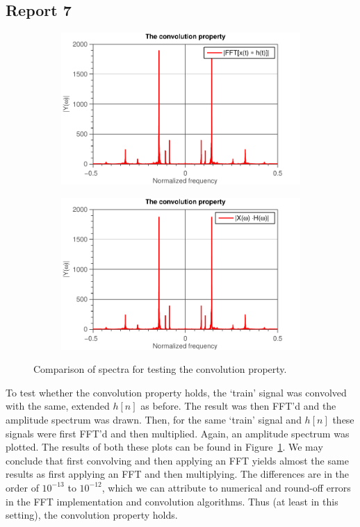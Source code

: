 \documentclass[11pt,titlepage]{report}
\begin{document}
\subsection{Report 7}
\begin{figure}[H]
	\centering
	\begin{subfigure}{0.49\textwidth}
		\includegraphics[width=\textwidth]{../../deliverable-7-resources/figures/ass-1/report-7/ass-1-report-7-convolution.pdf}
	\end{subfigure}
	\begin{subfigure}{0.49\textwidth}
		\includegraphics[width=\textwidth]{../../deliverable-7-resources/figures/ass-1/report-7/ass-1-report-7-multiplication.pdf}
	\end{subfigure}
	\caption{Comparison of spectra for testing the convolution property.}
	\label{fig:rep7-convolution}
\end{figure}

To test whether the convolution property holds, the `train' signal was convolved with the same, extended $h[n]$ as before. The result was then FFT'd and the amplitude spectrum was drawn. Then, for the same `train' signal and $h[n]$ these signals were first FFT'd and then multiplied. Again, an amplitude spectrum was plotted. The results of both these plots can be found in Figure~\ref{fig:rep7-convolution}. We may conclude that first convolving and then applying an FFT yields almost the same results as first applying an FFT and then multiplying. The differences are in the order of $10^{-13}$ to $10^{-12}$, which we can attribute to numerical and round-off errors in the FFT implementation and convolution algorithms. Thus (at least in this setting), the convolution property holds.
\end{document}
